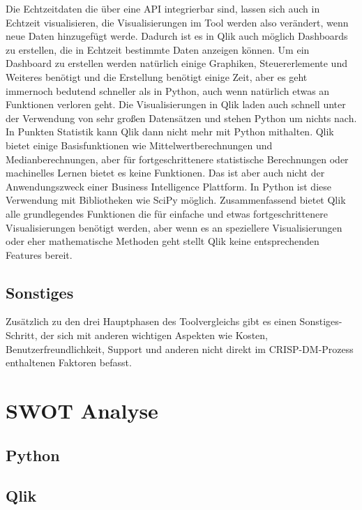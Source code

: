 \documentclass[12pt]{article}
\begin{document}
	Die Echtzeitdaten die über eine API integrierbar sind, lassen sich auch in Echtzeit visualisieren, die Visualisierungen im Tool werden also verändert, wenn neue Daten hinzugefügt werde. Dadurch ist es in Qlik auch möglich Dashboards zu erstellen, die in Echtzeit bestimmte Daten anzeigen können. Um ein Dashboard zu erstellen werden natürlich einige Graphiken, Steuererlemente und Weiteres benötigt und die Erstellung benötigt einige Zeit, aber es geht immernoch bedutend schneller als in Python, auch wenn natürlich etwas an Funktionen verloren geht.
	Die Visualisierungen in Qlik laden auch schnell unter der Verwendung von sehr großen Datensätzen und stehen Python um nichts nach.
	In Punkten Statistik kann Qlik dann nicht mehr mit Python mithalten. Qlik bietet einige Basisfunktionen wie Mittelwertberechnungen und Medianberechnungen, aber für fortgeschrittenere statistische Berechnungen oder machinelles Lernen bietet es keine Funktionen. Das ist aber auch nicht der Anwendungszweck einer Business Intelligence Plattform. In Python ist diese Verwendung mit Bibliotheken wie SciPy möglich.
	Zusammenfassend bietet Qlik alle grundlegendes Funktionen die für einfache und etwas fortgeschrittenere Visualisierungen benötigt werden, aber wenn es an speziellere Visualisierungen oder eher mathematische Methoden geht stellt Qlik keine entsprechenden Features bereit.
	
	\subsection{Sonstiges}
	Zusätzlich zu den drei Hauptphasen des Toolvergleichs gibt es einen Sonstiges-Schritt, der sich mit anderen wichtigen Aspekten wie Kosten, Benutzerfreundlichkeit, Support und anderen nicht direkt im CRISP-DM-Prozess enthaltenen Faktoren befasst.
	
	
	
	\section{SWOT Analyse}
	
	\subsection{Python}
	
	\subsection{Qlik}
	
\end{document}
